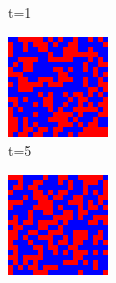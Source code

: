 \documentclass[a4paper, 11pt]{article}
\begin{document}
\begin{figure}[H]
\begin{subfigure}{.25\textwidth}
  \caption{t=1}
\end{subfigure}%
\begin{subfigure}{.25\textwidth}
  \centering
  \includegraphics[width=0.9\linewidth]{SNOWDRIFT_MOORE_20x20_t05}
  \caption{t=5}
\end{subfigure}%
\begin{subfigure}{.25\textwidth}
  \centering
  \includegraphics[width=0.9\linewidth]{SNOWDRIFT_MOORE_20x20_t10}

\end{subfigure}
\end{figure}
\end{document}
